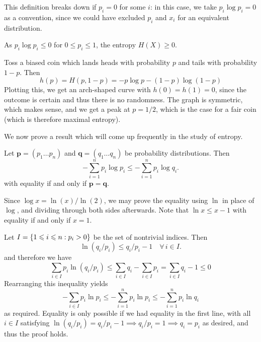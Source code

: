 \documentclass{article}
\begin{document}
\begin{note}
	This definition breaks down if $p_i = 0$ for some $i$: in this case, we take $p_i \log p_i = 0$ as a convention, since we could have excluded $p_i$ and $x_i$ for an equivalent distribution.
\end{note}

\begin{corollary}
    As $p_i \log p_i \leq 0$ for $0 \leq p_i \leq 1$, the entropy $H(X) \geq 0$.
\end{corollary}

\begin{example}
    Toss a biased coin which lands heads with probability $p$ and tails with probability $1-p$. Then
    \[
	h(p) = H(p, 1-p) = -p \log p - (1-p) \log (1-p)
	\]
	Plotting this, we get an arch-shaped curve with $h(0) = h(1) = 0$, since the outcome is certain and thus there is no randomness. The graph is symmetric, which makes sense, and we get a peak at $p = 1/2$, which is the case for a fair coin (which is therefore maximal entropy).
\end{example}

We now prove a result which will come up frequently in the study of entropy.

\begin{theorem}
	\label{gibbs-inequality}
    Let $\mathbf p = (p_1 \dots p_n)$ and $\mathbf q = (q_1 \dots q_n)$ be probability distributions. Then
    \[
	- \sum_{i=1}^n p_i \log p_i \leq - \sum_{i=1}^n p_i \log q_i.
	\]
	with equality if and only if $\mathbf p = \mathbf q$.
\end{theorem}
\begin{prf}
    Since $\log x = \ln (x) / \ln (2)$, we may prove the equality using $\ln$ in place of $\log$, and dividing through both sides afterwards. Note that $\ln x \leq x-1$ with equality if and only if $x=1$.
    
    Let $I = \left\lbrace 1 \leqslant i \leqslant n: p_i > 0 \right\rbrace$ be the set of nontrivial indices. Then
    \[
	\ln(q_i/p_i) \leq q_i / p_i - 1 \quad \forall \, i \in I.
	\]
	and therefore we have
	\[
	\sum_{i \in I} p_i \ln (q_i / p_i) \leq \sum_{i \in I} q_i - \sum_{i \in I} p_i = \sum_{i \in I} q_i - 1 \leq 0
	\]
	Rearranging this inequality yields
	\[
	- \sum_{i \in I} p_i \ln p_i \leq - \sum_{i=1}^n p_i \ln p_i \leq - \sum_{i=1}^n p_i \ln q_i
	\]
	as required. Equality is only possible if we had equality in the first line, with all $i \in I$ satisfying $\ln(q_i/p_i) = q_i / p_i - 1 \implies q_i / p_i = 1 \implies q_i = p_i$ as desired,
	and thus the proof holds.
\end{prf}
\end{document}
